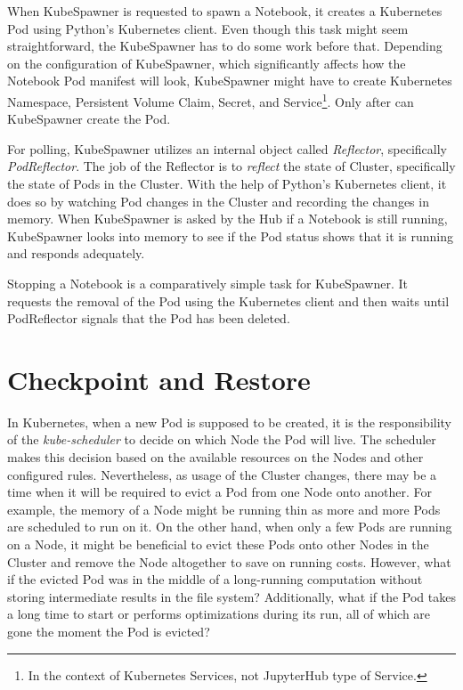 \documentclass[
  digital,     %
  oneside,     %
  nosansbold,  %
  nocolorbold, %
  lof,         %
  lot,         %
]{fithesis4}
\begin{document}
When KubeSpawner is requested to spawn a Notebook, it creates a Kubernetes Pod using Python's Kubernetes client. Even though this task might seem straightforward, the KubeSpawner has to do some work before that. Depending on the configuration of KubeSpawner, which significantly affects how the Notebook Pod manifest will look, KubeSpawner might have to create Kubernetes Namespace, Persistent Volume Claim, Secret, and Service\footnote{In the context of Kubernetes Services, not JupyterHub type of Service.}.
Only after can KubeSpawner create the Pod.

For polling, KubeSpawner utilizes an internal object called \emph{Reflector}, specifically \emph{PodReflector}. The job of the Reflector is to \emph{reflect} the state of Cluster, specifically the state of Pods in the Cluster. With the help of Python's Kubernetes client, it does so by watching Pod changes in the Cluster and recording the changes in memory. When KubeSpawner is asked by the Hub if a Notebook is still running, KubeSpawner looks into memory to see if the Pod status shows that it is running and responds adequately.

Stopping a Notebook is a comparatively simple task for KubeSpawner. It requests the removal of the Pod using the Kubernetes client and then waits until PodReflector signals that the Pod has been deleted.


\chapter{Checkpoint and Restore}
\label{chap:cr}
In Kubernetes, when a new Pod is supposed to be created, it is the responsibility of the \emph{kube-scheduler} to decide on which Node the Pod will live. The scheduler makes this decision based on the available resources on the Nodes and other configured rules. Nevertheless, as usage of the Cluster changes, there may be a time when it will be required to evict a Pod from one Node onto another. For example, the memory of a Node might be running thin as more and more Pods are scheduled to run on it. On the other hand, when only a few Pods are running on a Node, it might be beneficial to evict these Pods onto other Nodes in the Cluster and remove the Node altogether to save on running costs. However, what if the evicted Pod was in the middle of a long-running computation without storing intermediate results in the file system? Additionally, what if the Pod takes a long time to start or performs optimizations during its run, all of which are gone the moment the Pod is evicted?
\end{document}
